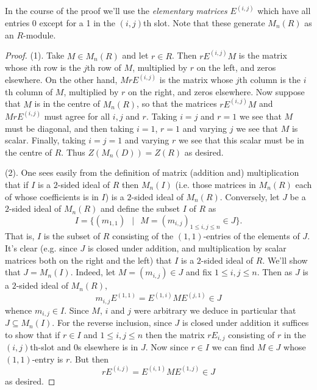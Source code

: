 \documentclass[11pt]{amsart}
\numberwithin{equation}{section}
\theoremstyle{remark}
\theoremstyle{remark}
\theoremstyle{remark}
\theoremstyle{definition}
\theoremstyle{definition}
\theoremstyle{definition}
\theoremstyle{definition}
\theoremstyle{definition}
\theoremstyle{definition}
\begin{document}
In the course of the proof we'll use the \textit{elementary matrices} $E^{(i,j)}$ which have all entries $0$ except for a 1 in the $(i,j)$th slot. Note that these generate $M_n(R)$ as an $R$-module. 

\begin{proof}
(1). Take $M\in M_n(R)$ and let $r\in R$. Then $rE^{(i,j)}M$ is the matrix whose $i$th row is the $j$th row of $M$, multiplied by $r$ on the left, and zeros elsewhere. On the other hand, $MrE^{(i,j)}$ is the matrix whose $j$th column is the $i$th column of $M$, multiplied by $r$ on the right, and zeros elsewhere. Now suppose that $M$ is in the centre of $M_n(R)$, so that the  matrices $rE^{(i,j)}M$ and $MrE^{(i,j)}$ must agree for all $i,j$ and $r$. Taking $i=j$ and $r=1$ we see that $M$ must be diagonal, and then taking $i=1$, $r=1$ and varying $j$ we see that $M$ is scalar. Finally, taking $i=j=1$ and varying $r$ we see that this scalar must be in the centre of $R$. Thus $Z(M_n(D))=Z(R)$ as desired. 

(2). One sees easily from the definition of matrix (addition and) multiplication that if $I$ is a $2$-sided ideal of $R$ then $M_n(I)$ (i.e. those matrices in $M_n(R)$ each of whose coefficients is in $I$) is a $2$-sided ideal of $M_n(R)$. Conversely, let $J$ be a $2$-sided ideal of $M_n(R)$ and define the subset $I$ of $R$ as
\[I=\{(m_{1,1})~~\mid~~M=(m_{i,j})_{1\leq i,j\leq n}\in J\}.\]
That is, $I$ is the subset of $R$ consisting of the $(1,1)$-entries of the elements of $J$. It's clear (e.g. since $J$ is closed under addition, and multiplication by scalar matrices both on the right and the left)  that $I$ is a $2$-sided ideal of $R$. We'll show that $J=M_n(I)$. Indeed, let $M=(m_{i,j})\in J$ and fix $1\leq i,j\leq n$. Then as $J$ is a $2$-sided ideal of $M_n(R)$,
\[m_{i,j}E^{(1,1)}=E^{(1,i)}ME^{(j,1)}\in J\]
whence $m_{i,j}\in I$. Since $M$, $i$ and $j$ were arbitrary we deduce in particular that $J\subseteq M_n(I)$. For the reverse inclusion, since $J$ is closed under addition it suffices to show that if $r\in I$ and $1\leq i,j\leq n$ then the matrix $rE_{i,j}$ consisting of $r$ in the $(i,j)$th-slot and $0$s elsewhere is in $J$. Now since $r\in I$ we can find $M\in J$ whose $(1,1)$-entry is $r$. But then
\[rE^{({i,j})}=E^{(i,1)}ME^{(1,j)}\in J\]
as desired.
\end{proof}
\end{document}

